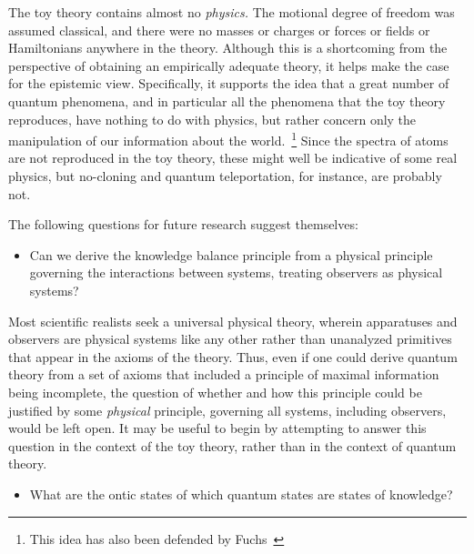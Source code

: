 \documentclass[pra,nofootinbib,showpacs,12pt]{revtex4}
\begin{document}
The toy theory contains almost no \emph{physics. }The motional
degree of freedom was assumed classical, and there were no masses
or charges or forces or fields or Hamiltonians anywhere in the
theory. Although this is a shortcoming from the perspective of
obtaining an empirically adequate theory, it helps make the case
for the epistemic view. Specifically, it supports the idea that a
great number of quantum phenomena, and in particular all the
phenomena that the toy theory reproduces, have nothing to do with
physics, but rather concern only the manipulation of our
information about the world.~\footnote{This idea has also been
defended by Fuchs~\cite{Fuchssamizdat}} Since the spectra of atoms
are not reproduced in the toy theory, these might well be
indicative of some real physics, but no-cloning and quantum
teleportation, for instance, are probably not.

The following questions for future research suggest themselves:

\begin{itemize}
\item Can we derive the knowledge balance principle from a physical
principle governing the interactions between systems, treating observers as
physical systems?
\end{itemize}

Most scientific realists seek a universal physical theory, wherein
apparatuses and observers are physical systems like any other rather than
unanalyzed primitives that appear in the axioms of the theory. Thus, even if
one could derive quantum theory from a set of axioms that included a
principle of maximal information being incomplete, the question of whether
and how this principle could be justified by some \emph{physical} principle,
governing all systems, including observers, would be left open. It may be
useful to begin by attempting to answer this question in the context of the
toy theory, rather than in the context of quantum theory.

\begin{itemize}
\item What are the ontic states of which quantum states are states of
knowledge?
\end{itemize}
\end{document}
